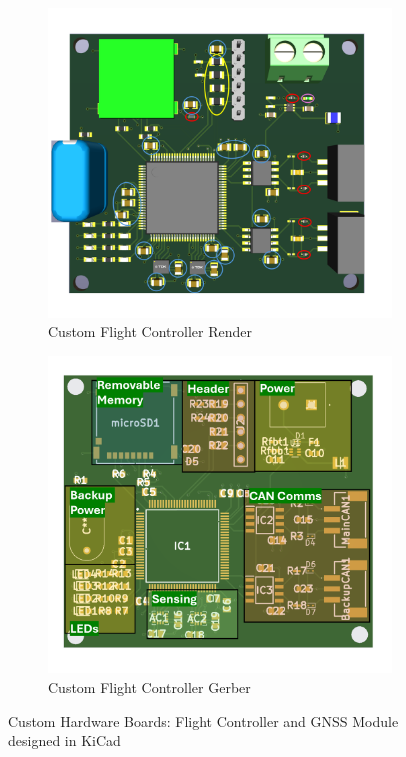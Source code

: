 \begin{figure}[htbp]
    \begin{subfigure}[b]{0.48\textwidth}
    \includegraphics[width=\textwidth]{figs/Thomas/Custom Hardware/FC render.png}
    \caption{Custom Flight Controller Render}
    \label{fig:fc_render}
  \end{subfigure}
  \hfill
  \begin{subfigure}[b]{0.48\textwidth}
    \includegraphics[width=\textwidth]{figs/Thomas/Custom Hardware/FC gerber.png}
    \caption{Custom Flight Controller Gerber}
    \label{fig:fc_gerber}
  \end{subfigure}

  \vspace{1em} %
  \caption{Custom Hardware Boards: Flight Controller and GNSS Module designed in KiCad}
  \label{fig:custom_hardware_overview}
\end{figure}
